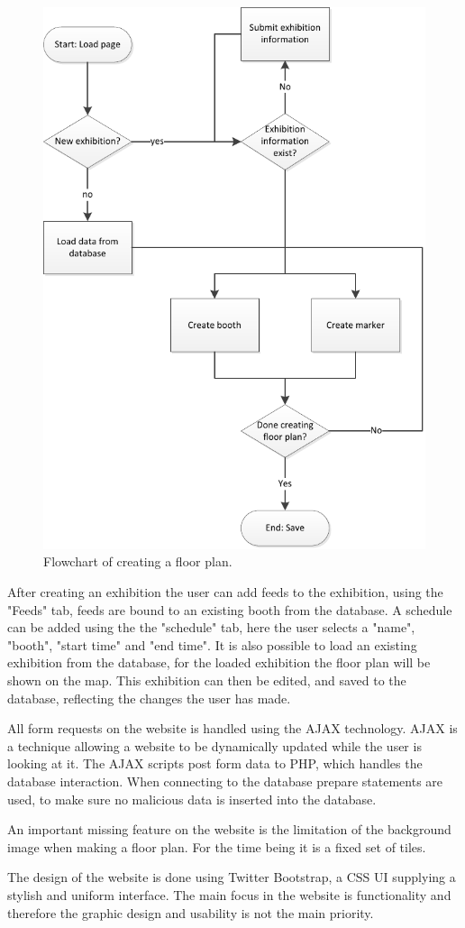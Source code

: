 \begin{figure}[H]
	\centering
	\includegraphics[width=0.7\linewidth]{img/floorplanflow.pdf}
	\caption{Flowchart of creating a floor plan.\label{fig:floorplan}}
\end{figure}

After creating an exhibition the user can add feeds to the exhibition, using the "Feeds" tab, feeds are bound to an existing booth from the database. A schedule can be added using the the "schedule" tab, here the user selects a "name", "booth", "start time" and "end time".
It is also possible to load an existing exhibition from the database, for the loaded exhibition the floor plan will be shown on the map. This exhibition can then be edited, and saved to the database, reflecting the changes the user has made.


All form requests on the website is handled using the AJAX technology\citep{ajax}. AJAX is a technique allowing a website to be dynamically updated while the user is looking at it.
The AJAX scripts post form data to PHP, which handles the database interaction. When connecting to the database prepare statements are used, to make sure no malicious data is inserted into the database.

An important missing feature on the website is the limitation of the background image when making a floor plan. For the time being it is a fixed set of tiles.

The design of the website is done using Twitter Bootstrap\citep{twitterbootstrap}, a CSS UI supplying a stylish and uniform interface.
The main focus in the website is functionality and therefore the graphic design and usability is not the main priority.
